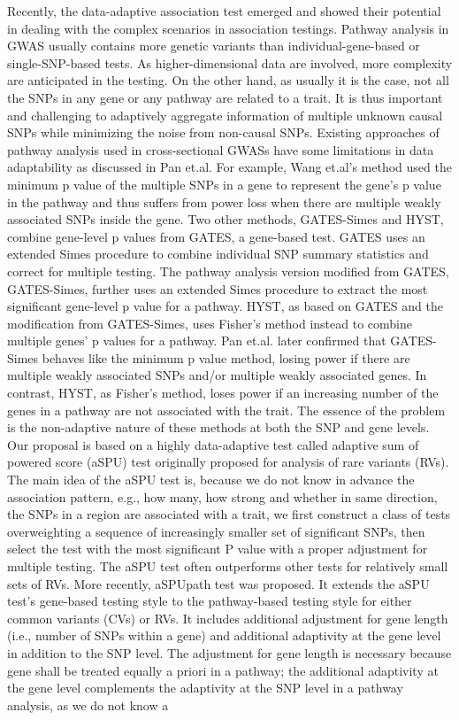 \documentclass[12pt]{article}
\begin{document}
Recently, the data-adaptive association test emerged and showed their potential in dealing with the complex scenarios in association testings.\cite{Pan2015,pan2014powerful} Pathway analysis in GWAS usually contains more genetic variants than individual-gene-based or single-SNP-based tests. As higher-dimensional data are involved, more complexity are anticipated in the testing. On the other hand, as usually it is the case, not all the SNPs in any gene or any pathway are related to a trait. It is thus important and challenging to adaptively aggregate information of multiple unknown causal SNPs while minimizing the noise from non-causal SNPs. Existing approaches of pathway analysis used in cross-sectional GWASs have some limitations in data adaptability as discussed in Pan et.al.\cite{Pan2015} For example, Wang et.al's method\cite{wang2007pathway} used the minimum p value of the multiple SNPs in a gene to represent the gene's p value in the pathway and thus suffers from power loss when there are multiple weakly associated SNPs inside the gene. Two other methods, GATES-Simes\cite{Gui2011} and HYST,\cite{Li2012} combine gene-level p values from GATES,\cite{Li2011} a gene-based test. GATES uses an extended Simes procedure to combine individual SNP summary statistics and correct for multiple testing. The pathway analysis version modified from GATES, GATES-Simes, further uses an extended Simes procedure to extract the most significant gene-level p value for a pathway. HYST, as based on GATES and the modification from GATES-Simes, uses Fisher's method instead to combine multiple genes' p values for a pathway. Pan et.al. later confirmed that GATES-Simes behaves like the minimum p value method, losing power if there are multiple weakly associated SNPs and/or multiple weakly associated genes. In contrast, HYST, as Fisher's method, loses power if an increasing number of the genes in a pathway are not associated with the trait. The essence of the problem is the non-adaptive nature of these methods at both the SNP and gene levels. Our proposal is based on a highly data-adaptive test called adaptive sum of powered score (aSPU) test originally proposed for analysis of rare variants (RVs).\cite{pan2014powerful} The main idea of the aSPU test is, because we do not know in advance the association pattern, e.g., how many, how strong and whether in same direction, the SNPs in a region are associated with a trait, we first construct a class of tests overweighting a sequence of increasingly smaller set of significant SNPs, then select the test with the most significant P value with a proper adjustment for multiple testing. The aSPU test often outperforms other tests for relatively small sets of RVs.\cite{pan2014powerful}  More recently, aSPUpath test\cite{Pan2015} was proposed. It extends the aSPU test's gene-based testing style to the pathway-based testing style for either common variants (CVs) or RVs. It includes additional adjustment for gene length (i.e., number of SNPs within a gene) and additional adaptivity at the gene level in addition to the SNP level. The adjustment for gene length is necessary because gene shall be treated equally a priori in a pathway; the additional adaptivity at the gene level complements the adaptivity at the SNP level in a pathway analysis, as we do not know a 
\end{document}
